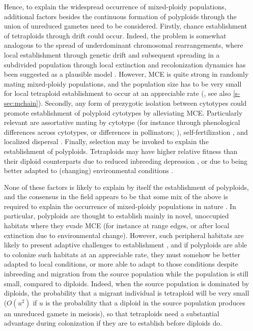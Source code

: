 \documentclass[unnumsec,webpdf,modern,large]{_oup-authoring-template}
\theoremstyle{thmstyleone}%
\theoremstyle{thmstyletwo}%
\theoremstyle{thmstylethree}%
\begin{document}
Hence, to explain the widespread occurrence of mixed-ploidy populations,
additional factors besides the continuous formation of polyploids through the
union of unreduced gametes need to be considered.
Firstly, chance establishment of tetraploids through drift could occur.
Indeed, the problem is somewhat analogous to the spread of underdominant
chromosomal rearrangements, where local establishment through genetic drift and
subsequent spreading in a subdivided population through local extinction and 
recolonization dynamics has been suggested as a plausible model
\citep{lande1985}.
However, MCE is quite strong in randomly mating mixed-ploidy populations, and
the population size has to be very small for local tetraploid establishment to
occur at an appreciable rate (\cite{rausch2005}, see also \cref{s-sec:mchain}).
Secondly, any form of prezygotic isolation between cytotypes could
promote establishment of polyploid cytotypes by alleviating MCE.
Particularly relevant are assortative mating by cytotype  (for instance through
phenological differences across cytotypes, or differences in pollinators;
\cite{kolar2017}), self-fertilization \citep{rausch2005,novikova2023}, and
localized dispersal \citep{baack2005,kolar2017}.
Finally, selection may be invoked to explain the establishment of polyploids.
Tetraploids may have higher relative fitness than their diploid counterparts
due to reduced inbreeding depression \citep{ronfort1999}, or due to being
better adapted to (changing) environmental conditions \citep{vandepeer2021}. 

None of these factors is likely to explain by itself the establishment of
polyploids, and the consensus in the field appears to be that some mix of the
above is required to explain the occurrence of mixed-ploidy populations in
nature \citep{kolar2017,mortier2024}.
In particular, polyploids are thought to establish mainly in novel, unoccupied
habitats where they evade MCE (for instance at range edges, or after local
extinction due to environmental change).
However, such peripheral habitats are likely to present adaptive challenges to
establishment \citep{kawecki2008}, and if polyploids are able to colonize such
habitats at an appreciable rate, they must somehow be better adapted to local
conditions, or more able to adapt to those conditions despite inbreeding and
migration from the source population while the population is still small,
compared to diploids.
Indeed, when the source population is dominated by diploids, the probability
that a migrant individual is tetraploid will be very small ($O(u^2)$ if $u$ is
the probability that a diploid in the source population produces an unreduced
gamete in meiosis), so that tetraploids need a substantial advantage during
colonization if they are to establish before diploids do.
\end{document}

